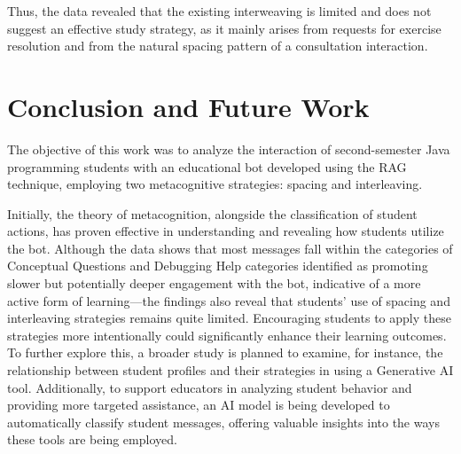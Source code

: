 \documentclass[a4paper,twoside]{article}
\begin{document}
Thus, the data revealed that the existing interweaving is limited and does not
suggest an effective study strategy, as it mainly arises from requests for
exercise resolution and from the natural spacing pattern of a consultation
interaction.

\section{Conclusion and Future Work}

The objective of this work was to analyze the interaction of second-semester
Java programming students with an educational bot developed using the RAG
technique, employing two metacognitive strategies: spacing and interleaving.

Initially, the theory of metacognition, alongside the classification of student
actions, has proven effective in understanding and revealing how students
utilize the bot. Although the data shows that most messages fall within the
categories of Conceptual Questions and Debugging Help categories identified as
promoting slower but potentially deeper engagement with the bot, indicative of a
more active form of learning—the findings also reveal that students' use of
spacing and interleaving strategies remains quite limited. Encouraging students
to apply these strategies more intentionally could significantly enhance their
learning outcomes. To further explore this, a broader study is planned to
examine, for instance, the relationship between student profiles and their
strategies in using a Generative AI tool. Additionally, to support educators
in analyzing student behavior and providing more targeted assistance, an AI
model is being developed to automatically classify student messages, offering
valuable insights into the ways these tools are being employed.




{\small
}
\end{document}
